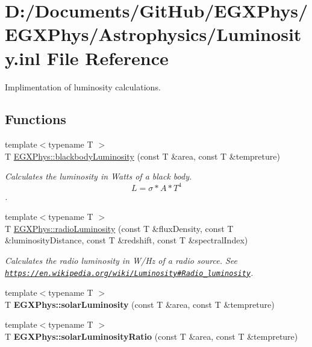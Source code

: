 \hypertarget{_luminosity_8inl}{}\section{D\+:/\+Documents/\+Git\+Hub/\+E\+G\+X\+Phys/\+E\+G\+X\+Phys/\+Astrophysics/\+Luminosity.inl File Reference}
\label{_luminosity_8inl}


Implimentation of luminosity calculations.  


\subsection*{Functions}
\begin{DoxyCompactItemize}
\item 
{\footnotesize template$<$typename T $>$ }\\T \hyperlink{_luminosity_8hpp_a909f82edfaed449b44e94788b642ebb8}{E\+G\+X\+Phys\+::blackbody\+Luminosity} (const T \&area, const T \&tempreture)
\begin{DoxyCompactList}\small\item\em Calculates the luminosity in Watts of a black body. \[L=\sigma*A*T^4\]. \end{DoxyCompactList}\item 
{\footnotesize template$<$typename T $>$ }\\T \hyperlink{_luminosity_8hpp_a6d6865b2aac1bc7c7f06b7c4ac2444e4}{E\+G\+X\+Phys\+::radio\+Luminosity} (const T \&flux\+Density, const T \&luminosity\+Distance, const T \&redshift, const T \&spectral\+Index)
\begin{DoxyCompactList}\small\item\em Calculates the radio luminosity in W/\+Hz of a radio source. See \href{https://en.wikipedia.org/wiki/Luminosity#Radio_luminosity}{\tt https\+://en.\+wikipedia.\+org/wiki/\+Luminosity\#\+Radio\+\_\+luminosity}. \end{DoxyCompactList}\item 
\mbox{\label{_luminosity_8inl_ade3d05c9dcd810cb5290375d11587b6a}} 
{\footnotesize template$<$typename T $>$ }\\T {\bfseries E\+G\+X\+Phys\+::solar\+Luminosity} (const T \&area, const T \&tempreture)
\item 
\mbox{\label{_luminosity_8inl_ac5e66686d7910587e3636b7984d466e9}} 
{\footnotesize template$<$typename T $>$ }\\T {\bfseries E\+G\+X\+Phys\+::solar\+Luminosity\+Ratio} (const T \&area, const T \&tempreture)
\end{DoxyCompactItemize}



